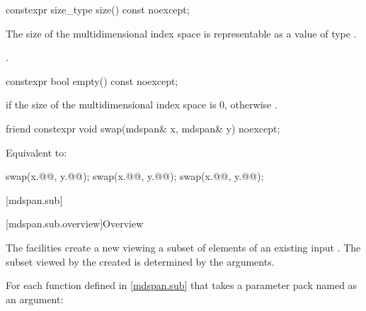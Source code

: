 %
\begin{itemdecl}
constexpr size_type size() const noexcept;
\end{itemdecl}

\begin{itemdescr}
\pnum
\expects
The size of the multidimensional index space 
is representable as a value of type .

\pnum
\returns
{}.
\end{itemdescr}

%
\begin{itemdecl}
constexpr bool empty() const noexcept;
\end{itemdecl}

\begin{itemdescr}
\pnum
\returns
{}
if the size of the multidimensional index space  is 0,
otherwise .
\end{itemdescr}

%
\begin{itemdecl}
friend constexpr void swap(mdspan& x, mdspan& y) noexcept;
\end{itemdecl}

\begin{itemdescr}
\pnum
\effects
Equivalent to:
\begin{codeblock}
swap(x.@@, y.@@);
swap(x.@@, y.@@);
swap(x.@@, y.@@);
\end{codeblock}
\end{itemdescr}

[mdspan.sub]{}

[mdspan.sub.overview]{Overview}

\pnum
The  facilities create a new 
viewing a subset of elements of an existing input .
The subset viewed by the created  is determined by
the  arguments.

\pnum
For each function defined in \ref{mdspan.sub} that
takes a parameter pack named  as an argument:

